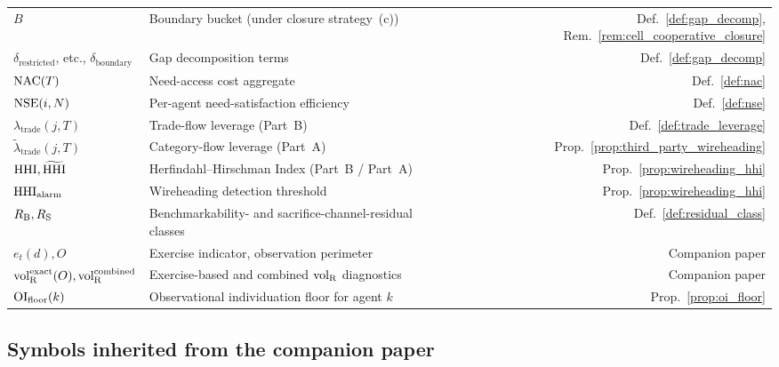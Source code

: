 \begin{center}
\begin{tabular}{@{}llr@{}}
$B$ & Boundary bucket (under closure strategy~(c))
  & Def.~\ref{def:gap_decomp},
  Rem.~\ref{rem:cell_cooperative_closure} \\
$\delta_{\mathrm{restricted}}$, etc.,
  $\delta_{\mathrm{boundary}}$
  & Gap decomposition terms
  & Def.~\ref{def:gap_decomp} \\
$\mathrm{NAC}(T)$ & Need-access cost aggregate
  & Def.~\ref{def:nac} \\
$\mathrm{NSE}(i, N)$ & Per-agent need-satisfaction efficiency
  & Def.~\ref{def:nse} \\
$\lambda_{\mathrm{trade}}(j, T)$ & Trade-flow leverage
  (Part~B)
  & Def.~\ref{def:trade_leverage} \\
$\tilde\lambda_{\mathrm{trade}}(j, T)$ & Category-flow leverage
  (Part~A)
  & Prop.~\ref{prop:third_party_wireheading} \\
$\mathrm{HHI}, \widetilde{\mathrm{HHI}}$ & Herfindahl--Hirschman Index
  (Part~B / Part~A)
  & Prop.~\ref{prop:wireheading_hhi} \\
$\mathrm{HHI}_{\mathrm{alarm}}$ & Wireheading detection threshold
  & Prop.~\ref{prop:wireheading_hhi} \\
$R_{\mathrm{B}}, R_{\mathrm{S}}$ & Benchmarkability- and
  sacrifice-channel-residual classes
  & Def.~\ref{def:residual_class} \\
$e_t(d), O$ & Exercise indicator, observation perimeter
  & Companion paper \\
${\operatorname{vol}_{\mathrm{R}}^{\mathrm{exact}}}(O), {\operatorname{vol}_{\mathrm{R}}^{\mathrm{combined}}}$
  & Exercise-based and combined ${\operatorname{vol}_{\mathrm{R}}}$ diagnostics
  & Companion paper \\
$\mathrm{OI}_{\mathrm{floor}}(k)$ & Observational individuation floor for agent
  $k$
  & Prop.~\ref{prop:oi_floor} \\
\bottomrule
\end{tabular}
\end{center}

\subsection{Symbols inherited from the companion
paper~\citep[Revealed~Sacrifice]{lasser2026paper8a}}


